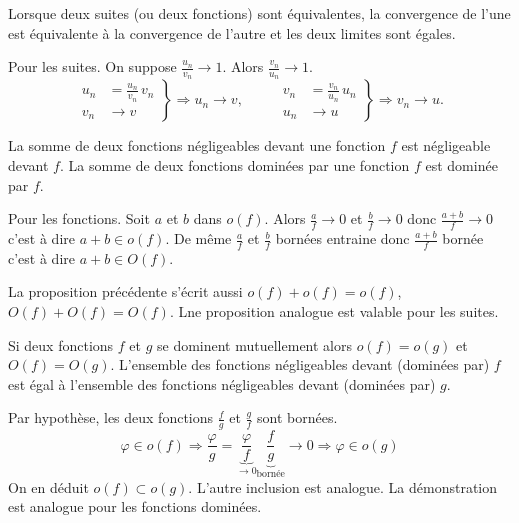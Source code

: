 \begin{prop}
 Lorsque deux suites (ou deux fonctions) sont équivalentes, la convergence de l'une est équivalente à la convergence de l'autre et les deux limites sont égales.
\end{prop}
\begin{demo}
 Pour les suites. On suppose $\frac{u_n}{v_n} \rightarrow 1$. Alors $\frac{v_n}{u_n} \rightarrow 1$.
\[
 \left. 
 \begin{aligned}
  u_n &= \frac{u_n}{v_n}\, v_n \\ v_n &\rightarrow v
 \end{aligned}
\right\rbrace \Rightarrow u_n \rightarrow v,
\hspace{1cm}
 \left. 
 \begin{aligned}
  v_n &= \frac{v_n}{u_n}\, u_n \\ u_n &\rightarrow u
 \end{aligned}
\right\rbrace \Rightarrow v_n \rightarrow u.
\]

\end{demo}

\begin{prop}
  La somme de deux fonctions négligeables devant une fonction $f$ est négligeable devant $f$. La somme de deux fonctions dominées par une fonction $f$ est dominée par $f$.
\end{prop}
\begin{demo}
 Pour les fonctions. Soit $a$ et $b$ dans $o(f)$. Alors $\frac{a}{f}\rightarrow 0$ et $\frac{b}{f}\rightarrow 0$ donc $\frac{a + b}{f}\rightarrow 0$ c'est à dire $a+b\in o(f)$.\newline
 De même $\frac{a}{f}$ et $\frac{b}{f}$ bornées entraine donc $\frac{a + b}{f}$ bornée c'est à dire $a+b\in O(f)$.
\end{demo}
\begin{rem}
 La proposition précédente s'écrit aussi $o(f) + o(f) = o(f)$, $O(f) + O(f) = O(f)$. Lne proposition analogue est valable pour les suites.
\end{rem}

\begin{prop}
  Si deux fonctions $f$ et $g$ se dominent mutuellement alors $o(f) = o(g)$ et $O(f) = O(g)$. L'ensemble des fonctions négligeables devant (dominées par) $f$ est égal à l'ensemble des fonctions négligeables devant (dominées par) $g$.
\end{prop}
\begin{demo}
 Par hypothèse, les deux fonctions $\frac{f}{g}$ et $\frac{g}{f}$ sont bornées.
\[
 \varphi \in o(f) \Rightarrow \frac{\varphi}{g} = \underset{\rightarrow 0}{\underbrace{\frac{\varphi}{f}}} \underset{\text{bornée}}{\underbrace{\frac{f}{g}}} \rightarrow 0 
 \Rightarrow \varphi \in o(g)
\]
On en déduit $o(f)\subset o(g)$. L'autre inclusion est analogue. La démonstration est analogue pour les fonctions dominées.
\end{demo}

